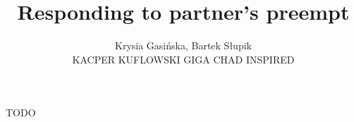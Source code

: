 \documentclass[12pt, a4paper]{article}
\title{Responding to partner's preempt}
\author{Krysia Gasińska, Bartek Słupik\\
        \textsc{KACPER KUFLOWSKI GIGA CHAD INSPIRED}}
\begin{document}
\maketitle


TODO

\end{document}
